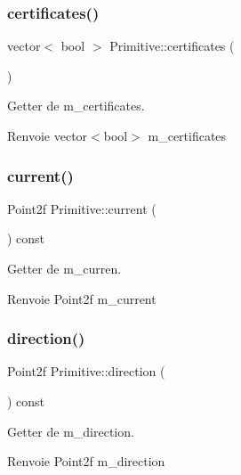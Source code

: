 \subsubsection{\texorpdfstring{certificates()}{certificates()}}
{\footnotesize\ttfamily vector$<$ bool $>$ Primitive\+::certificates (\begin{DoxyParamCaption}{ }\end{DoxyParamCaption})}



Getter de m\+\_\+certificates. 

\begin{DoxyReturn}{Renvoie}
vector$<$bool$>$ m\+\_\+certificates 
\end{DoxyReturn}
\mbox{\label{classPrimitive_a4abb7b712bb47b8862802ea35036ad2a}} 
\subsubsection{\texorpdfstring{current()}{current()}}
{\footnotesize\ttfamily Point2f Primitive\+::current (\begin{DoxyParamCaption}{ }\end{DoxyParamCaption}) const}



Getter de m\+\_\+curren. 

\begin{DoxyReturn}{Renvoie}
Point2f m\+\_\+current 
\end{DoxyReturn}
\mbox{\label{classPrimitive_a3b5bb082b6f0358c4b5cd1333e9c359d}} 
\subsubsection{\texorpdfstring{direction()}{direction()}}
{\footnotesize\ttfamily Point2f Primitive\+::direction (\begin{DoxyParamCaption}{ }\end{DoxyParamCaption}) const}



Getter de m\+\_\+direction. 

\begin{DoxyReturn}{Renvoie}
Point2f m\+\_\+direction 
\end{DoxyReturn}
\mbox{\label{classPrimitive_a3a3e177ac6afb1b474592993f448da22}} 
